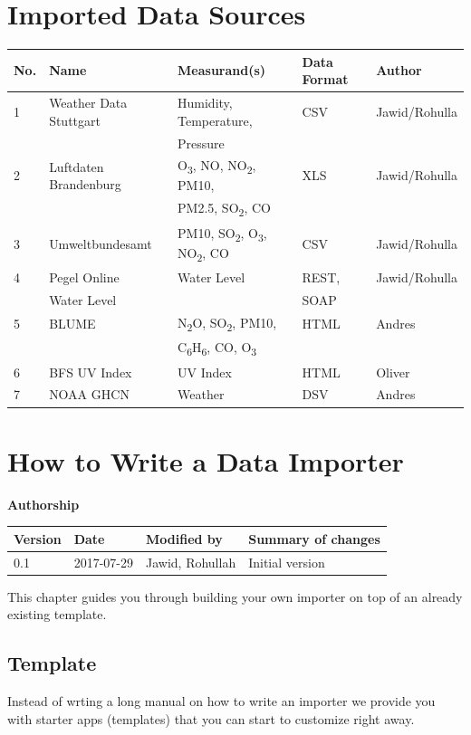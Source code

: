 \section{Imported Data Sources}

\begin{longtable}{lllll}
\toprule
 No. & Name  & Measurand(s) & Data Format & Author \tabularnewline
\midrule
\endhead
 1 & Weather Data Stuttgart & Humidity, Temperature, & CSV & Jawid/Rohulla \tabularnewline
   & & Pressure & & \tabularnewline
 2 & Luftdaten Brandenburg & O\textsubscript{3}, NO, NO\textsubscript{2}, PM10, & XLS & Jawid/Rohulla \tabularnewline
	 & & PM2.5, SO\textsubscript{2}, CO & & \tabularnewline
 3 & Umweltbundesamt & PM10, SO\textsubscript{2}, O\textsubscript{3}, NO\textsubscript{2}, CO & CSV &  Jawid/Rohulla  \tabularnewline
 4 & Pegel Online & Water Level & REST, & Jawid/Rohulla  \tabularnewline
   & Water Level & & SOAP & \tabularnewline
 5 & BLUME & N\textsubscript{2}O, SO\textsubscript{2}, PM10, & HTML & Andres \tabularnewline
	 & & C\textsubscript{6}H\textsubscript{6}, CO, O\textsubscript{3} & & \tabularnewline
 6 & BFS UV Index & UV Index & HTML & Oliver\tabularnewline
 7 & NOAA GHCN & Weather & DSV & Andres \tabularnewline
\bottomrule
\end{longtable}

\section{How to Write a Data Importer}\label{how-to-write-a-data-importer}

\textbf{Authorship}

\begin{longtable}[]{@{}llll@{}}
\toprule
Version & Date & Modified by & Summary of changes\tabularnewline
\midrule
\endhead
0.1 & 2017-07-29 & Jawid, Rohullah & Initial version\tabularnewline
\bottomrule
\end{longtable}

\vspace*{4mm}

This chapter guides you through building your own importer on top of an
already existing template.

\subsection{Template}\label{template}

Instead of wrting a long manual on how to write an importer we provide
you with starter apps (templates) that you can start to customize right
away.

